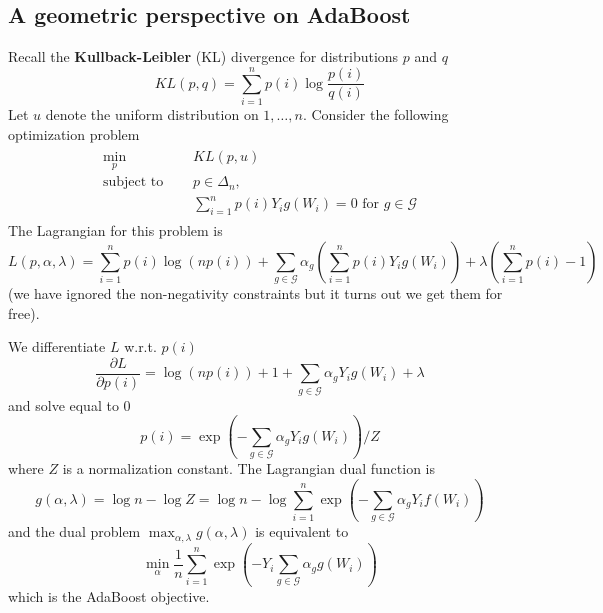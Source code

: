 \subsection{A geometric perspective on AdaBoost}
Recall the \textbf{Kullback-Leibler} (KL) divergence for distributions $p$ and $q$
\begin{equation*}
	KL(p, q) = \sum_{i=1}^n p(i) \log \frac{p(i)}{q(i)}
\end{equation*}
Let $u$ denote the uniform distribution on $1, \dots, n$. Consider the following optimization problem
\begin{align*}
	\begin{aligned}
		\min_p\quad   & KL(p, u)\\
		\text{subject to }\quad & p\in \Delta_n, \\
								& \sum_{i=1}^n p(i)Y_i g(W_i) = 0 \text{ for } g \in \mathcal{G}
	\end{aligned}
\end{align*}
The Lagrangian for this problem is
\begin{equation*}
	L(p, \alpha, \lambda) = \sum_{i=1}^n p(i) \log (np(i)) + \sum_{g \in \mathcal{G}} \alpha_g \left( \sum_{i=1}^n p(i)Y_i g(W_i) \right) + \lambda \left(\sum_{i=1}^n p(i) - 1\right)
\end{equation*}
(we have ignored the non-negativity constraints but it turns out we get them for free).

We differentiate $L$ w.r.t. $p(i)$
\begin{equation*}
	\frac{\partial L}{\partial p(i)} = \log(np(i)) + 1 + \sum_{g \in \mathcal{G}} \alpha_g Y_i g(W_i) + \lambda
\end{equation*}
and solve equal to 0
\begin{equation*}
	p(i) = \exp \left( - \sum_{g \in \mathcal{G}} \alpha_g Y_i g(W_i) \right)/Z
\end{equation*}
where $Z$ is a normalization constant.
The Lagrangian dual function is
\begin{equation*}
	g(\alpha, \lambda) = \log n - \log Z = \log n - \log \sum_{i=1}^n \exp \left( - \sum_{g \in \mathcal{G}} \alpha_g Y_i f(W_i) \right)
\end{equation*}
and the dual problem $\max_{\alpha, \lambda} g(\alpha, \lambda)$ is equivalent to
\begin{equation*}
	\min_\alpha \frac{1}{n}\sum_{i=1}^n \exp\left( - Y_i \sum_{g \in \mathcal{G}} \alpha_g g(W_i)\right)
\end{equation*}
which is the AdaBoost objective.

